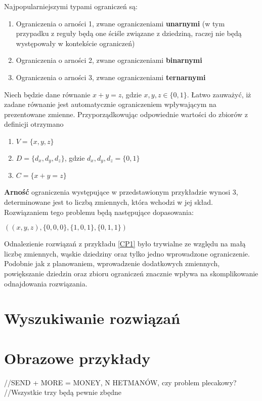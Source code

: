     Najpopularniejszymi typami ograniczeń są:
    \begin{enumerate}
        \item Ograniczenia o arności 1, zwane ograniczeniami \textbf{unarnymi} (w tym przypadku z reguły będą one ściśle związane z dziedziną, raczej 
        nie będą występowały w kontekście ograniczeń)
        \item Ograniczenia o arności 2, zwane ograniczeniami \textbf{binarnymi}
        \item Ograniczenia o arności 3, zwane ograniczeniami \textbf{ternarnymi}
    \end{enumerate} 

    \begin{example}
        \label{CP1}
        Niech będzie dane równanie $x+y=z$, gdzie $x,y,z \in \{0,1\}$. Łatwo zauważyć, iż zadane równanie jest automatycznie ograniczeniem 
        wpływającym na prezentowane zmienne. Przyporządkowując odpowiednie wartości do zbiorów z definicji \label{ConstraintProblem} otrzymano
        \begin{enumerate}
            \item $ V = \{x,y,z\} $
            \item $ D = \{d_{x},d_{y},d_{z}\}$, gdzie $d_{x},d_{y},d_{z} = \{0,1\}$
            \item $ C = \{x+y=z\}$
        \end{enumerate}
        \textbf{Arność} ograniczenia występujące w przedstawionym przykładzie wynosi 3, determinowane jest to liczbą zmiennych, która wchodzi w jej skład.
        Rozwiązaniem tego problemu będą następujące dopasowania:

        
        $((x,y,z),\{0,0,0\}, \{1,0,1\}, \{0,1,1\})$

    \end{example}
    Odnalezienie rozwiązań z przykładu \ref{CP1} było trywialne ze względu na małą liczbę zmiennych, wąskie dziedziny oraz tylko jedno wprowadzone ograniczenie.
    Podobnie jak z planowaniem, wprowadzenie dodatkowych zmiennych, powiększanie dziedzin oraz zbioru ograniczeń znacznie wpływa na skomplikowanie 
    odnajdowania rozwiązania.

\section{Wyszukiwanie rozwiązań}

\section{Obrazowe przykłady}

//SEND + MORE = MONEY, N HETMANÓW, czy problem plecakowy?
//Wszystkie trzy będą pewnie zbędne

